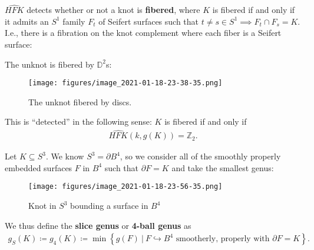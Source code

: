 \begin{fact}

\(\widehat{HFK}\) detects whether or not a knot is \textbf{fibered},
where \(K\) is fibered if and only if it admits an \(S^1\) family
\(F_t\) of Seifert surfaces such that
\(t\neq s\in S^1 \implies F_t \cap F_s = K\). I.e., there is a fibration
on the knot complement where each fiber is a Seifert surface:

\begin{center}
\end{center}

\begin{example}

The unknot is fibered by \({\mathbb{D}}^2\)s:

\begin{figure}
\centering
\texttt{[image: figures/image\_2021-01-18-23-38-35.png]}
\caption{The unknot fibered by discs.}
\end{figure}

\end{example}

This is ``detected'' in the following sense: \(K\) is fibered if and
only if
\begin{align*}
\widehat{HFK}(k, g(K)) = {\mathbb{Z}}_2
.\end{align*}

\end{fact}

\begin{definition}

Let \(K \subseteq S^3\). We know \(S^3 = {{\partial}}B^4\), so we
consider all of the smoothly properly embedded surfaces \(F\) in \(B^4\)
such that \({{\partial}}F = K\) and take the smallest genus:

\begin{figure}
\centering
\texttt{[image: figures/image\_2021-01-18-23-56-35.png]}
\caption{Knot in \(S^3\) bounding a surface in \(B^4\)}
\end{figure}

We thus define the \textbf{slice genus} or \textbf{4-ball genus} as
\begin{align*}
g_S(K) \coloneqq g_4(K) \coloneqq\min 
\left\{{
g(F) {~\mathrel{\Big|}~}F\hookrightarrow B^4 \text{ smootherly, properly with } {{\partial}}F = K
}\right\}
.\end{align*}

\end{definition}


